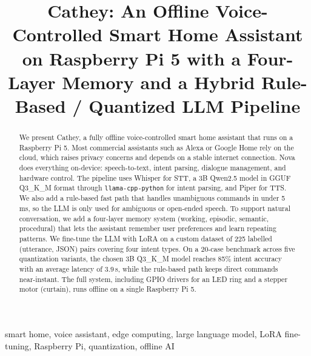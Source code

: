 \documentclass[conference]{IEEEtran}
\begin{document}
\title{Cathey: An Offline Voice-Controlled Smart Home Assistant on Raspberry Pi 5 with a Four-Layer Memory and a Hybrid Rule-Based / Quantized LLM Pipeline}

\author{
\and
{}
\and
{}
}

\maketitle

\begin{abstract}
We present Cathey, a fully offline voice-controlled smart home assistant that runs on a Raspberry Pi 5. Most commercial assistants such as Alexa or Google Home rely on the cloud, which raises privacy concerns and depends on a stable internet connection. Nova does everything on-device: speech-to-text, intent parsing, dialogue management, and hardware control. The pipeline uses Whisper for STT, a 3B Qwen2.5 model in GGUF Q3\_K\_M format through \texttt{llama-cpp-python} for intent parsing, and Piper for TTS. We also add a rule-based fast path that handles unambiguous commands in under 5\,ms, so the LLM is only used for ambiguous or open-ended speech. To support natural conversation, we add a four-layer memory system (working, episodic, semantic, procedural) that lets the assistant remember user preferences and learn repeating patterns. We fine-tune the LLM with LoRA on a custom dataset of 225 labelled (utterance, JSON) pairs covering four intent types. On a 20-case benchmark across five quantization variants, the chosen 3B Q3\_K\_M model reaches 85\% intent accuracy with an average latency of 3.9\,s, while the rule-based path keeps direct commands near-instant. The full system, including GPIO drivers for an LED ring and a stepper motor (curtain), runs offline on a single Raspberry Pi 5.
\end{abstract}

\begin{IEEEkeywords}
smart home, voice assistant, edge computing, large language model, LoRA fine-tuning, Raspberry Pi, quantization, offline AI
\end{IEEEkeywords}
\end{document}
